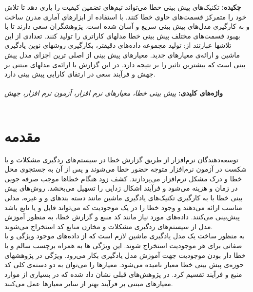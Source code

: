 \thispagestyle{empty}
\noindent
\renewcommand*\thesection{\arabic{section}}
\textbf{\large{چکیده:}}
تکنیک‌های پیش بینی خطا می‌تواند تیم‌های تضمین کیفیت را یاری دهد تا تلاش خود را متمرکز قسمت‌های حاوی خطا کنند. با استفاده از ابزارهای آماری مدرن  ساخت و به کارگیری مدل‌های پیش بینی سریع و آسان شده است. پژوهشگران سعی دارند تا با بهبود قسمت‌های مختلف پیش بینی خطا مدلهای کاراتری را تولید کنند. تعدادی از این تلاشها عبارتند از: ‌تولید مجموعه داده‌های دقیقتر، بکارگیری روشهای نوین یادگیری ماشین و ارائه‌ی معیارهای جدید. معیارهای پیش بینی از اصلی ترین اجزای مدل پیش بینی است که بیشترین تاثیر را بر نتیجه دارد. در این گزارش با‌ ارائه‌ی مدلهای مبتنی بر جهش و فرآیند سعی در ارتقای کارایی پیش بینی دارد. 
\\\\
\textbf{واژه‌های کلیدی:}\textit{ 
پیش بینی خطا، معیارهای نرم افزار، آزمون نرم افزار، جهش
}\\\\
\section{مقدمه}
\label{sec:intro}
  توسعه‌دهندگان نرم‌افزار از طریق گزارش خطا در سیستم‌های ردگیری مشکلات  و یا شکست در آزمون نرم‌افزار متوجه حضور خطا می‌شوند و پس از آن به جستجوی محل خطا و درک مشکل  نرم‌افزار می‌پردازند. کشف زود هنگام خطاها موجب صرفه جویی در زمان و هزینه می‌شود و فرآیند اشکال زدایی را تسهیل می‌بخشد. روش‌های پیش بینی خطا با به کارگیری تکنیک‌های یادگیری ماشین مانند دسته ‌بندهای  و   و غیره، مدلی مناسب ارائه می‌دهند و وجود خطا را در یک موجودیت که می‌تواند فایل و یا تابع باشد پیش‌بینی می‌کنند. داده‌های مورد نیاز مانند کد منبع و گزارش خطا، به منظور آموزش مدل از سیستم‌های ردگیری مشکلات و مخازن منابع کد  استخراج می‌شوند. \\
  
 به منظور ساخت یک مدل یادگیری ماشین لازم است که از داده‌های موجود ویژگی و یا صفاتی   برای هر موجودیت استخراج شوند. این ویژگی ها به همراه برچسب سالم و یا خطا دار بودن موجودیت جهت آموزش مدل یادگیری بکار می‌رود.  ویژگی  در پژوهشهای حوزه‌ی پیش بینی خطا معیار   نامیده می‌شود.  معیارها را می‌توان به دو دسته‌ی کلی کد منبع و فرآیند تقسیم کرد. در پژوهش‌های قبلی نشان داد شده که در بسیاری از موارد معیارهای مبتنی بر فرآیند بهتر از سایر معیارها عمل می‌کنند\cite{rahman2013and}\cite{radjenovic2013software}. \\
 
